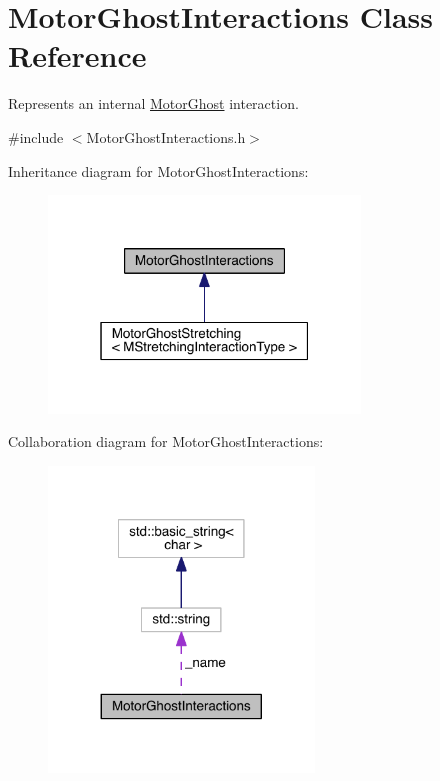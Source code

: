 \hypertarget{classMotorGhostInteractions}{\section{Motor\+Ghost\+Interactions Class Reference}
\label{classMotorGhostInteractions}
}


Represents an internal \hyperlink{classMotorGhost}{Motor\+Ghost} interaction.  




{\ttfamily \#include $<$Motor\+Ghost\+Interactions.\+h$>$}



Inheritance diagram for Motor\+Ghost\+Interactions\+:\nopagebreak
\begin{figure}[H]
\begin{center}
\leavevmode
\includegraphics[width=235pt]{classMotorGhostInteractions__inherit__graph}
\end{center}
\end{figure}


Collaboration diagram for Motor\+Ghost\+Interactions\+:\nopagebreak
\begin{figure}[H]
\begin{center}
\leavevmode
\includegraphics[width=200pt]{classMotorGhostInteractions__coll__graph}
\end{center}
\end{figure}
